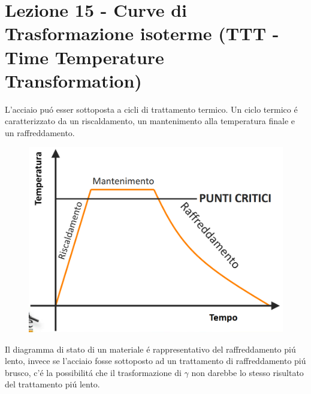 \documentclass{article}
\begin{document}
{    \section{Lezione 15 - Curve di Trasformazione isoterme (TTT - Time Temperature Transformation)}
        L'acciaio pu\'o esser sottoposta a cicli di trattamento termico. Un ciclo termico \'e caratterizzato da un riscaldamento, un mantenimento alla temperatura finale e un raffreddamento.\\
        \begin{figure}[h!]
            \centering
            \includegraphics[width=.7\linewidth]{Metallurgia/L15 - Diagramma ciclo termico ideale.png}
        \end{figure}
        \newpage
        Il diagramma di stato di un materiale \'e rappresentativo del raffreddamento pi\'u lento, invece se l'acciaio fosse sottoposto ad un trattamento di raffreddamento pi\'u brusco, c'\'e la possibilit\'a che il trasformazione di $\gamma$ non darebbe lo stesso risultato del trattamento pi\'u lento.\\
}
\end{document}
